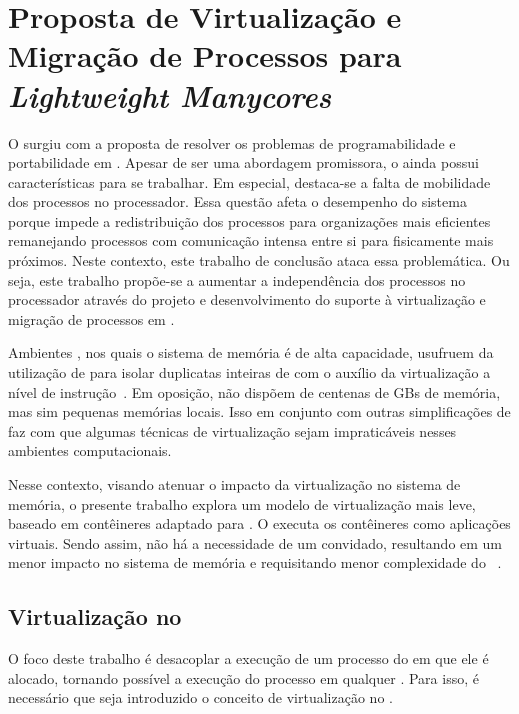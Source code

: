 \glsresetall
\chapter{Proposta de Virtualização e Migração de Processos para \textit{Lightweight Manycores}}
\label{chap.dev.virtualizacao}

O \nanvix surgiu com a proposta de resolver os problemas de programabilidade e portabilidade em \lws. Apesar de ser uma abordagem promissora, o \so ainda possui características para se trabalhar. Em especial, destaca-se a falta de mobilidade dos processos no processador. Essa questão afeta o desempenho do sistema porque impede a redistribuição dos processos para organizações mais eficientes \eg remanejando processos com comunicação intensa entre si para \clusters fisicamente mais próximos. Neste contexto, este trabalho de conclusão ataca essa problemática. Ou seja, este trabalho propõe-se a aumentar a independência dos processos no processador através do projeto e desenvolvimento do suporte à virtualização e migração de processos em \lws.

Ambientes \cloud, nos quais o sistema de memória é de alta capacidade, usufruem da utilização de \vms para isolar duplicatas inteiras de \oss com o auxílio da virtualização a nível de instrução~\cite{sharma2016containers}. Em oposição, \lws não dispõem de centenas de GBs de memória, mas sim pequenas memórias locais. Isso em conjunto com outras simplificações de \hardware faz com que algumas técnicas de virtualização sejam impraticáveis nesses ambientes computacionais.


Nesse contexto, visando atenuar o impacto da virtualização no sistema de memória, o presente trabalho explora um modelo de virtualização mais leve, baseado em contêineres adaptado para \lws. O \so executa os contêineres como aplicações virtuais. Sendo assim, não há a necessidade de um \os convidado, resultando em um menor impacto no sistema de memória e requisitando menor complexidade do \hardware~\cite{thalheim2018cntr, sharma2016containers}.


\section{Virtualização no \nanvix}

O foco deste trabalho é desacoplar a execução de um processo do \cluster em que ele é alocado, tornando possível a execução do processo em qualquer \cluster. Para isso, é necessário que seja introduzido o conceito de virtualização no \nanvix.

